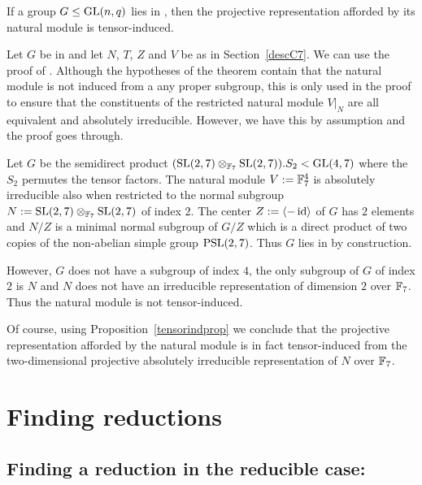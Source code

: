 \begin{Prop}
    \label{tensorindprop}
If a group $G \le \GL(n,q)$ lies in , then the projective
representation afforded by its natural module is tensor-induced.
\end{Prop}
\proofbeg
Let $G$ be in  and let $N$, $T$, $Z$ and $V$ be as in
Section~\ref{descC7}.
We can use the proof of \cite[Tensor Induction Theorem]{kovacs}. 
Although the hypotheses of
the theorem contain that the natural module is not induced from a any
proper subgroup, this is only used in the proof to ensure that the
constituents of the restricted natural module $V|_N$ are all
equivalent and absolutely irreducible. However, we have this by
assumption and the proof goes through.
\proofend

\begin{Rem}
    \label{nottensorind}
    Let $G$ be the semidirect product 
    $(\SL(2,7) \otimes_{\F_7} \SL(2,7)).S_2 < \GL(4,7)$ where the
    $S_2$ permutes the tensor factors. The natural module $V := \mathbb{F}_7^4$ is
    absolutely irreducible also when restricted to the normal subgroup
    $N := \SL(2,7) \otimes_{\F_7} \SL(2,7)$ of index $2$. The center 
    $Z := \left< -\id \right>$ of $G$ has $2$ elements and $N/Z$ is a
    minimal normal subgroup of $G/Z$ which is a direct product of two
    copies of the non-abelian simple group $\PSL(2,7)$. Thus $G$ lies
    in  by construction.

    However, $G$ does not have a subgroup of index $4$, the only 
    subgroup of $G$ of index $2$ is $N$ and $N$ does
    not have an irreducible representation of dimension $2$ over
    $\mathbb{F}_7$. Thus the natural module is not tensor-induced.

    Of course, using Proposition~\ref{tensorindprop} we conclude that
    the projective representation afforded by the natural module is in
    fact tensor-induced from the two-dimensional projective
    absolutely irreducible representation of $N$ over $\mathbb{F}_7$.
\end{Rem}

\section{Finding reductions}
\label{findred}

\subsection{Finding a reduction in the reducible case: }
\label{solveC1}

